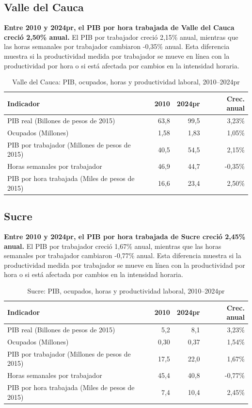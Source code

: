 \subsection{Valle del Cauca}
\textbf{Entre 2010 y 2024pr, el PIB por hora trabajada de Valle del Cauca creció 2,50\% anual.} El PIB por trabajador creció 2,15\% anual, mientras que las horas semanales por trabajador cambiaron -0,35\% anual. Esta diferencia muestra si la productividad medida por trabajador se mueve en línea con la productividad por hora o si está afectada por cambios en la intensidad horaria.
\begin{table}[H]
\centering
\caption{Valle del Cauca: PIB, ocupados, horas y productividad laboral, 2010--2024pr}
\label{tab:departamento_valle_del_cauca_productividad}
\scriptsize
\begin{tabular}{lrrr}
\toprule
Indicador & 2010 & 2024pr & Crec. anual \\
\midrule
PIB real (Billones de pesos de 2015) & 63,8 & 99,5 & 3,23\% \\
Ocupados (Millones) & 1,58 & 1,83 & 1,05\% \\
PIB por trabajador (Millones de pesos de 2015) & 40,5 & 54,5 & 2,15\% \\
Horas semanales por trabajador & 46,9 & 44,7 & -0,35\% \\
PIB por hora trabajada (Miles de pesos de 2015) & 16,6 & 23,4 & 2,50\% \\
\bottomrule
\end{tabular}
\end{table}

\subsection{Sucre}
\textbf{Entre 2010 y 2024pr, el PIB por hora trabajada de Sucre creció 2,45\% anual.} El PIB por trabajador creció 1,67\% anual, mientras que las horas semanales por trabajador cambiaron -0,77\% anual. Esta diferencia muestra si la productividad medida por trabajador se mueve en línea con la productividad por hora o si está afectada por cambios en la intensidad horaria.
\begin{table}[H]
\centering
\caption{Sucre: PIB, ocupados, horas y productividad laboral, 2010--2024pr}
\label{tab:departamento_sucre_productividad}
\scriptsize
\begin{tabular}{lrrr}
\toprule
Indicador & 2010 & 2024pr & Crec. anual \\
\midrule
PIB real (Billones de pesos de 2015) & 5,2 & 8,1 & 3,23\% \\
Ocupados (Millones) & 0,30 & 0,37 & 1,54\% \\
PIB por trabajador (Millones de pesos de 2015) & 17,5 & 22,0 & 1,67\% \\
Horas semanales por trabajador & 45,4 & 40,8 & -0,77\% \\
PIB por hora trabajada (Miles de pesos de 2015) & 7,4 & 10,4 & 2,45\% \\
\bottomrule
\end{tabular}
\end{table}

